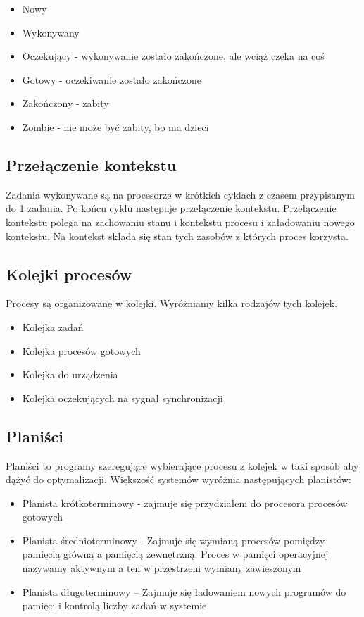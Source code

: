 \documentclass{../notatki}
\begin{document}
\begin{itemize}
  \item Nowy
  \item Wykonywany
  \item Oczekujący - wykonywanie zostało zakończone, ale wciąż czeka na coś
  \item Gotowy - oczekiwanie zostało zakończone
  \item Zakończony - zabity
  \item Zombie - nie może być zabity, bo ma dzieci
\end{itemize}

\subsection{Przełączenie kontekstu}

Zadania wykonywane są na procesorze w krótkich cyklach z czasem
przypisanym do 1 zadania. Po końcu cyklu następuje przełączenie kontekstu.
Przełączenie kontekstu polega na zachowaniu stanu i kontekstu procesu
i załadowaniu nowego kontekstu. Na kontekst składa się stan tych
zasobów z których proces korzysta.

\subsection{Kolejki procesów}

Procesy są organizowane w kolejki. Wyróżniamy kilka rodzajów tych kolejek.

\begin{itemize}
  \item Kolejka zadań
  \item Kolejka procesów gotowych
  \item Kolejka do urządzenia
  \item Kolejka oczekujących na sygnał synchronizacji
\end{itemize}

\subsection{Planiści}

Planiści to programy szeregujące wybierające procesu z kolejek w taki
sposób aby dążyć do optymalizacji. Większość systemów wyróżnia
następujących planistów:

\begin{itemize}
  \item Planista krótkoterminowy - zajmuje się przydziałem do
    procesora procesów gotowych
  \item Planista średnioterminowy - Zajmuje się wymianą procesów
    pomiędzy pamięcią główną a pamięcią zewnętrzną. Proces w pamięci
    operacyjnej nazywamy aktywnym a ten w przestrzeni wymiany zawieszonym
  \item Planista długoterminowy – Zajmuje się ładowaniem nowych
    programów do pamięci i kontrolą liczby zadań w systemie
\end{itemize}
\end{document}
